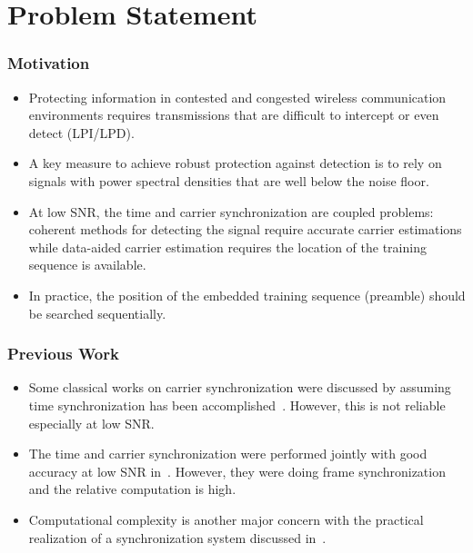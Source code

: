 \section{Problem Statement}


\begin{frame}
  \frametitle{Motivation}
  \begin{itemize}
    \item Protecting information in contested and congested wireless communication environments requires transmissions that are difficult to intercept or even detect (LPI/LPD). 
     \item A key measure to achieve robust protection against detection is to rely on signals with power spectral densities that are well below the noise floor. 
     \item At low SNR, the time and carrier synchronization are coupled problems: coherent methods for detecting the signal require accurate carrier estimations while data-aided carrier estimation requires the location of the training sequence is available.
     \item In practice, the position of the embedded training sequence (preamble) should be searched sequentially.
 
 \end{itemize}
\end{frame}


\begin{frame}
    \frametitle{Previous Work}
    \begin{itemize}
        \item Some classical works on carrier synchronization were discussed by assuming time synchronization has been accomplished~\cite{Morelli_Mengali_98}. However, this is not reliable especially at low SNR.
        \item The time and carrier synchronization were performed jointly with good accuracy at low SNR in~\cite{purushothaman_16,kim_17}. However, they were doing frame synchronization and the relative
        computation is high.
        \item Computational complexity is another major concern with the practical realization of a synchronization system discussed in~\cite{murin_16,wang_21}.
    
    \end{itemize}
  \end{frame}



